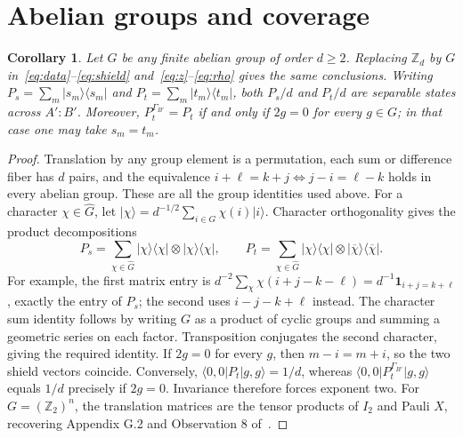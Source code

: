 \documentclass[11pt]{article}
\newcommand{\ket}[1]{\lvert #1\rangle}
\newcommand{\bra}[1]{\langle #1\rvert}
\newcommand{\proj}[1]{\ket{#1}\bra{#1}}
\newtheorem{corollary}[theorem]{Corollary}
\begin{document}
\section{Abelian groups and coverage}

\begin{corollary}\label{cor:group}
Let $G$ be any finite abelian group of order $d\geq2$.
Replacing $\mathbb Z_d$ by $G$ in~\eqref{eq:data}--\eqref{eq:shield}
and~\eqref{eq:z}--\eqref{eq:rho} gives the same conclusions.
Writing $P_s=\sum_m\proj{s_m}$ and $P_t=\sum_m\proj{t_m}$,
both $P_s/d$ and $P_t/d$ are separable states across $A':B'$. Moreover,
$P_t^{\Gamma_{B'}}=P_t$ if and only if $2g=0$ for every $g\in G$;
in that case one may take $s_m=t_m$.
\end{corollary}
\begin{proof}
Translation by any group element is a permutation, each sum or difference
fiber has $d$ pairs, and the equivalence
$i+\ell=k+j\Longleftrightarrow j-i=\ell-k$ holds in every abelian group.
These are all the group identities used above. For a character
$\chi\in\widehat G$, let
$\ket\chi=d^{-1/2}\sum_{i\in G}\chi(i)\ket i$.
Character orthogonality gives the product decompositions
\[
 P_s=\sum_{\chi\in\widehat G}\proj\chi\otimes\proj\chi,
 \qquad
 P_t=\sum_{\chi\in\widehat G}\proj\chi\otimes\proj{\overline\chi}.
\]
For example, the first matrix entry is
$d^{-2}\sum_\chi\chi(i+j-k-\ell)=d^{-1}\mathbf1_{i+j=k+\ell}$,
exactly the entry of $P_s$; the second uses $i-j-k+\ell$ instead.
The character sum identity follows by writing $G$ as a product of cyclic
groups and summing a geometric series on each factor.
Transposition conjugates the second character, giving the required identity.
If $2g=0$ for every $g$,
then $m-i=m+i$, so the two shield vectors coincide.
Conversely, $\bra{0,0}P_t\ket{g,g}=1/d$, whereas
$\bra{0,0}P_t^{\Gamma_{B'}}\ket{g,g}$ equals $1/d$ precisely if
$2g=0$. Invariance therefore forces exponent two.
For $G=(\mathbb Z_2)^n$, the translation matrices are the tensor products
of $I_2$ and Pauli $X$, recovering Appendix G.2 and Observation 8
of~\cite{Pal2021}.
\end{proof}
\end{document}
